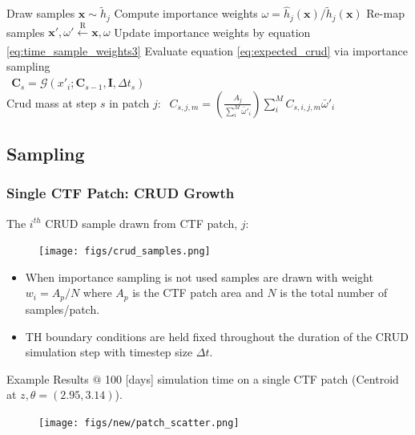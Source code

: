 \documentclass[t, pdftex]{beamer}
\begin{document}
\begin{frame}
\begin{algorithm}[H]
\begin{algorithmic}[1]
            \STATE Draw samples $\mathbf x \sim \tilde h_j$ \;
            \STATE Compute importance weights $\omega = \hat h_j(\mathbf x) /  \tilde h_j(\mathbf x) $
            \STATE Re-map samples  $\mathbf x', \omega' \xleftarrow[\text{ }]{\text{R}} \mathbf x, \omega $
            \STATE Update importance weights by equation \ref{eq:time_sample_weights3}
            \STATE Evaluate equation \ref{eq:expected_crud} via importance sampling \\
            $\ \ \mathbf C_s = \mathcal G(x'_i; \mathbf C_{s-1}, \mathbf I, \Delta t_s)$ \\
            \STATE Crud mass at step $s$ in patch $j$:
            $\ \ C_{s,j,m} = \left( \frac{A_j}{\sum_i^M \bar \omega'_i} \right) \sum_i^M C_{s,i,j,m} \bar \omega'_i$
            \ENDFOR
            \ENDFOR
            \ENDFOR
        \end{algorithmic}
        \label{algo:hi2lo_crud_algo}
    \end{algorithm}
\end{frame}


\subsection*{Sampling}
\begin{frame}
\frametitle{Single CTF Patch: CRUD Growth}
The $i^{th}$ CRUD sample drawn from CTF patch, $j$:
\begin{figure}[!htbp]
\centering
\texttt{[image: figs/crud\_samples.png]}
\label{model_overview}
\end{figure}
\begin{itemize}
\item When importance sampling is not used samples are drawn with weight $w_i=A_p/N$ where $A_p$ is the CTF patch area and $N$ is the total number of samples/patch.
\item TH boundary conditions are held fixed throughout the duration of the CRUD simulation step with timestep size $\Delta t$.
\end{itemize}
\end{frame}

\begin{frame}
\tiny Example Results $@$ 100 [days] simulation time on a single CTF patch (Centroid at $z,\theta=(2.95, 3.14)$). 
\begin{figure}[!htbp]
\centering
\texttt{[image: figs/new/patch\_scatter.png]}
\label{model_overview}
\end{figure}
\end{frame}
\end{document}
